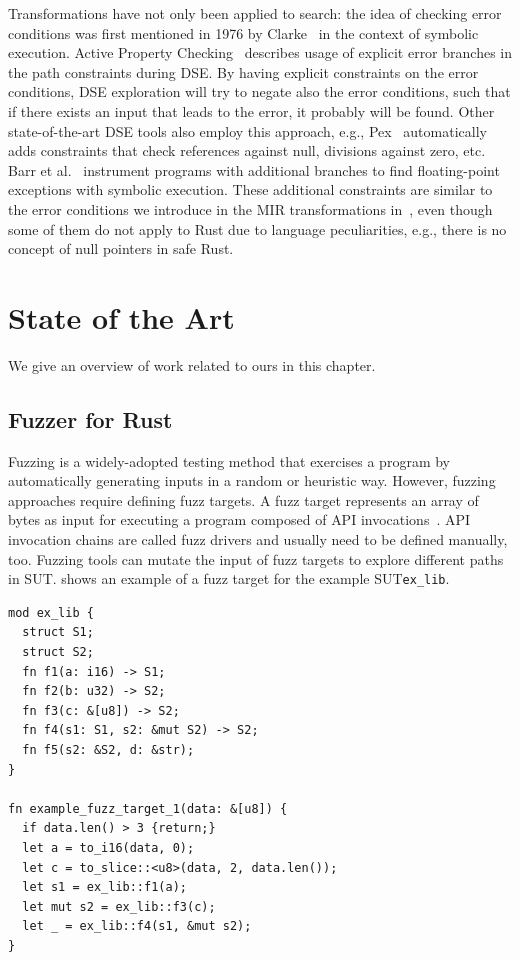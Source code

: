 \documentclass[paper=a4,%
  twoside,%
  BCOR4mm,%
  abstract=true,%
  toc=bibliography,%
  chapterprefix=true,%
  toc=bibliographynumbered,%
  open=right,%
  english,%
  pagesize=pdftex]{scrreprt}
\newcommand{\mir}{\ac{MIR}\xspace}
\newcommand{\sut}{\ac{SUT}\xspace}
\begin{document}

Transformations have not only been applied to search: the idea of checking error conditions was first mentioned in 1976 by Clarke~\cite{Clarke1976} in the context of symbolic execution. Active Property Checking~\cite{Godefroid_2005} describes usage of explicit error branches in the path constraints during \ac{DSE}. By having explicit constraints on the error conditions, \ac{DSE} exploration will try to negate also the error conditions, such that if there exists an input that leads to the error, it probably will be found. Other state-of-the-art \ac{DSE} tools also employ this approach, e.g., Pex~\cite{Tillmann2008} automatically adds constraints that check references against null, divisions against zero, etc. Barr et al.~\cite{Barr2013} instrument programs with additional branches to find floating-point exceptions with symbolic execution. These additional constraints are similar to the error conditions we introduce in the \mir transformations in~, even though some of them do not apply to Rust due to language peculiarities, e.g., there is no concept of null pointers in safe Rust.

\clearpage
\chapter{State of the Art}
\label{chap:state-of-the-art}
We give an overview of work related to ours in this chapter.

\section{Fuzzer for Rust}
Fuzzing is a widely-adopted testing method that exercises a program by automatically generating inputs in a random or heuristic way. However, fuzzing approaches require defining fuzz targets. A fuzz target represents an array of bytes as input for executing a program composed of \ac{API} invocations~\cite{Jiang2021}. \ac{API} invocation chains are called fuzz drivers and usually need to be defined manually, too. Fuzzing tools can mutate the input of fuzz targets to explore different paths in \sut.  shows an example of a fuzz target for the example \sut \texttt{ex\_lib}.

\begin{lstlisting}[style=boxed, caption={A sample problem for fuzz target generation~\cite{Jiang2021}}, label=lst:fuzz-target-example]
mod ex_lib {
  struct S1;
  struct S2;
  fn f1(a: i16) -> S1;
  fn f2(b: u32) -> S2;
  fn f3(c: &[u8]) -> S2;
  fn f4(s1: S1, s2: &mut S2) -> S2;
  fn f5(s2: &S2, d: &str);
}

fn example_fuzz_target_1(data: &[u8]) {
  if data.len() > 3 {return;}
  let a = to_i16(data, 0);
  let c = to_slice::<u8>(data, 2, data.len());
  let s1 = ex_lib::f1(a);
  let mut s2 = ex_lib::f3(c);
  let _ = ex_lib::f4(s1, &mut s2);
}
\end{lstlisting}
\end{document}
